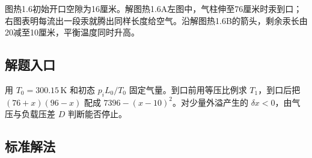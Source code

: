 \documentclass[UTF8,fontset=fandol,a4paper,11pt]{ctexart}
\begin{document}
图热1.6初始开口空隙为16厘米。解图热1.6A左图中，气柱伸至76厘米时汞到口；右图表明每流出一段汞就腾出同样长度给空气。沿解图热1.6B的箭头，剩余汞长由20减至10厘米，平衡温度同时升高。



\subsection*{解题入口}

用 $T_0=300.15\,\mathrm K$ 和初态 $p_iL_0/T_0$ 固定气量。到口前用等压比例求 $T_1$，到口后把 $(76+x)(96-x)$ 配成 $7396-(x-10)^2$。对少量外溢产生的 $\delta x<0$，由气压与负载压差 $D$ 判断能否停止。



\subsection*{标准解法}
\end{document}
